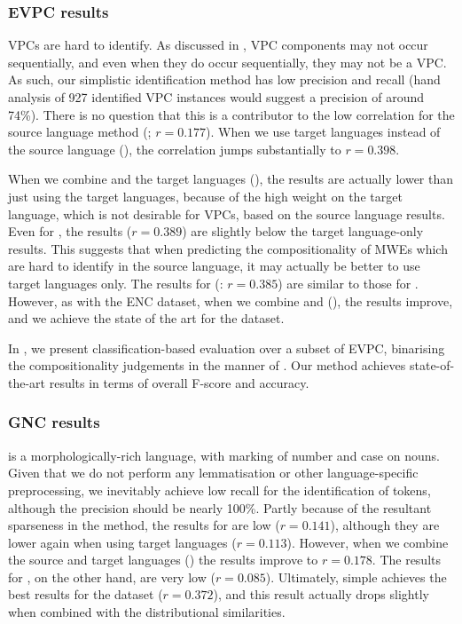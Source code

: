 \documentclass[output=paper,modfonts,nonflat]{langsci/langscibook}
\begin{document}
\subsubsection{EVPC results}

 VPCs are hard to identify. As discussed in , VPC
components may not occur sequentially, and even when they do occur
sequentially, they may not be a VPC. As such, our simplistic
identification method has low precision and recall (hand analysis of 927
identified VPC instances would suggest a precision of around 74\%). There is no
question that this is a contributor to the low correlation for the
source language method (\CSsource; $r = 0.177$). When we use target
languages instead of the source language (\CStarg), the correlation
jumps substantially to $r = 0.398$.

When we combine  and the target languages (\CSsourcetarg), the
results are actually lower than just using the target languages, because
of the high weight on the target language, which is not desirable for
VPCs, based on the source language results. Even for \CSsvr, the results
($r = 0.389$) are slightly below the target language-only results. This
suggests that when predicting the compositionality of MWEs which are
hard to identify in the source language, it may actually be better to
use target languages only. The results for  (\CSstring:
$r = 0.385$) are similar to those for \CStarg. However, as with the ENC
dataset, when we combine  and 
(\CSall), the results improve, and we achieve the state of the art for
the dataset.

In , we present classification-based evaluation
over a subset of EVPC, binarising the compositionality judgements in the
manner of \citet{bannard2003}. Our method achieves state-of-the-art
results in terms of overall F-score and accuracy.



\subsubsection{GNC results}

 is a morphologically-rich language, with marking of number and
case on nouns. Given that we do not perform any lemmatisation or other
language-specific preprocessing, we inevitably achieve low recall for
the identification of  tokens, although the precision
should be nearly 100\%. Partly because of the resultant sparseness in
the  method, the results for \CSsource are
low ($r = 0.141$), although they are lower again when using target
languages ($r = 0.113$). However, when we combine the source and
target languages (\CSsourcetarg) the results improve to $r =
0.178$. The results for \CSsvr, on the other hand, are very low ($r =
0.085$). Ultimately, simple  achieves the best
results for the dataset ($r = 0.372$), and this result actually drops
slightly when combined with the distributional similarities.
\end{document}
